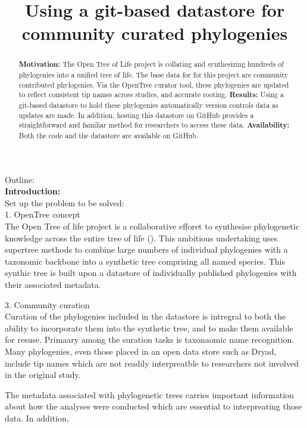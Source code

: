 \documentclass[a4paper,10pt]{article}
\title{Using a git-based datastore for community curated phylogenies}
\author{}
\begin{document}
\maketitle

\begin{abstract}
\textbf{Motivation:}
The Open Tree of Life project is collating and synthesizing hundreds of phylogenies into a unified tree of life. 
The base data for for this project are community contributed phylogenies. 
Via the OpenTree curator tool, these phylogenies are updated to reflect consistent tip names across studies, and accurate rooting. 
\textbf{Results:}
Using a git-based datastore to hold these phylogenies automatically version controls data as updates are made. 
In addition, hosting this datastore on GitHub provides a straightforward and familiar method for researchers to access these data. 
\textbf{Availability:}
Both the code and the datastore are available on GitHub.
\end{abstract}


Outline:\\

\textbf{Introduction:}\\

Set up the problem to be solved:\\

   1. OpenTree concept\\
The Open Tree of life project is a collaborative efforet to synthesise phylogenetic knowledge across the entire tree of life (\cite{smith science?}).
This ambitious undertaking uses supertree methods to combine large numbers of individual phylogenies with a taxonomic backbone into a synthetic tree comprising all named species.
This synthic tree is built upon a datastore of individually published phylogenies with their associated metadata. 

   3. Community curation\\
Curation of the phylogenies included in the datastore is intregral to both the ability to incorporate them into the synthetic tree, and to make them available for resuse.
Primaary among the suration tasks is taxonaomic name recognition.
Many phylogenies, even those placed in an open data store such as Dryad, include tip names which are not readily interpreatble to researchers not involved in the original study.


The metadata associated with phylogenetic trees carries important information about how the analyses were conducted which are essential to interpreating those data.
In addition, 
\end{document}
